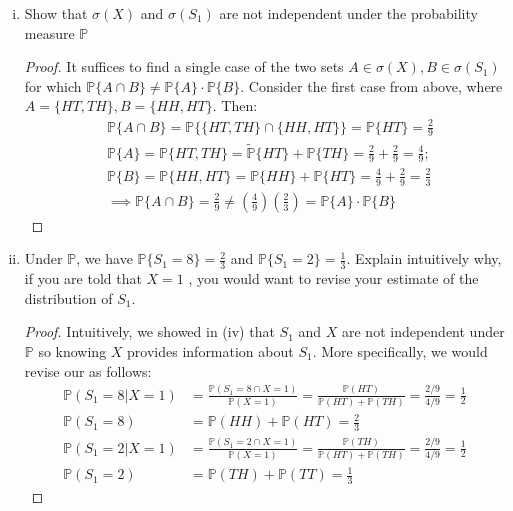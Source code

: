 \documentclass{article}
\newcommand{\p}{\mathbb{P}}
\newcommand{\tp}{\tilde{\p}}
\newcommand{\seq}[1]{\{ #1 \}}
\theoremstyle{definition}
\theoremstyle{definition}
\begin{document}
\begin{enumerate}
\begin{enumerate}[(i)]
\begin{proof}
    Since intersection of $\Omega$ with any of the subsets is itself, and $\p(\Omega) = 1$, the independence condition holds trivially for those sets. Similarly intersection of $\emptyset$ with any set is $\emptyset$, and since $\p(\emptyset)=0$, the independence condition is vacuously true for those sets as well.
    \end{proof}
    
    \item Show that $\sigma(X)$ and $\sigma(S_1)$ are not independent under the probability measure $\p$
    
    \begin{proof} 
        It suffices to find a single case of the two sets $A\in \sigma(X), B \in \sigma(S_1) $ for which $\p\seq{A \cap B} \neq \p\{A\}\cdot \p\{B\}$. Consider the first case from above, where $A = \seq{HT,TH},B= \seq{HH,HT}$. Then:
    \begin{align*}
        &\p\seq{A \cap B} = \p\seq{\seq{HT,TH} \cap \seq{HH,HT}} = \p\seq{HT} = \frac{2}{9} \\
        &\p\seq{A} = \p\seq{HT,TH} = \tp\{HT\}+\p\{TH\} = \frac{2}{9}+ \frac{2}{9}=\frac{4}{9};\\
         & \p\seq{B} =\p\seq{HH,HT} = \p\{HH\}+\p\{HT\} = \frac{4}{9}+\frac{2}{9}=\frac{2}{3} \\
         & \implies  \p\seq{A \cap B} = \frac{2}{9} \neq \left(\frac{4}{9}\right)\left(\frac{2}{3}\right)= \p\seq{A}\cdot \p\seq{B}
    \end{align*}
    \end{proof}
    
    \item Under $\p$, we have $\p\seq{S_1=8} = \frac{2}{3}$ and $\p\seq{S_1=2} = \frac{1}{3}$. Explain intuitively
why, if you are told that $X = 1$ , you would want to revise your estimate
of the distribution of $S_1$.

\begin{proof}
Intuitively, we showed in (iv) that $S_1$ and $X$ are not independent under $\p$ so knowing $X$ provides information about $S_1$. More specifically, we would revise our as follows:
 \begin{align*}
     \p(S_1=8|X=1) &= \frac{\p(S_1=8 \cap X=1)}{\p(X=1)} = \frac{\p(HT)}{\p(HT)+\p(TH)} = \frac{2/9}{4/9} = \frac{1}{2} \\
     \p(S_1 = 8) &= \p(HH) + \p(HT) = \frac{2}{3} \\
     \p(S_1=2|X=1) &= \frac{\p(S_1=2 \cap X=1)}{\p(X=1)} = \frac{\p(TH)}{\p(HT)+\p(TH)} = \frac{2/9}{4/9} = \frac{1}{2} \\
     \p(S_1=2) &=\p(TH) + \p(TT) = \frac{1}{3}
\end{align*}



\end{proof}
\end{enumerate}
\end{enumerate}
\end{document}
